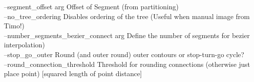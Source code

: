 {  --segment\_offset arg                 Offset of Segment (from partitioning)\\
  --no\_tree\_ordering  Disables ordering of the tree (Useful when manual image from Timo!)\\
  --number\_segments\_bezier\_connect arg Define the number of segments for bezier interpolation)\\
  --stop\_go\_outer                      Round (and outer round) outer contours
                                       or stop-turn-go cycle?\\
  --round\_connection\_threshold         Threshold for rounding connections 
                                       (otherwise just place point) [squared 
                                       length of point distance]
}
\normalsize